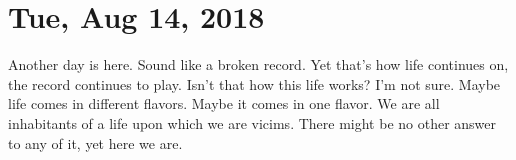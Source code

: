 \section{Tue, Aug 14, 2018}

Another day is here. Sound like a broken record. Yet that's how life continues on,
the record continues to play. Isn't that how this life works? I'm not sure. Maybe
life comes in different flavors. Maybe it comes in one flavor. We are all inhabitants
of a life upon which we are vicims. There might be no other answer to any of it, yet
here we are.
